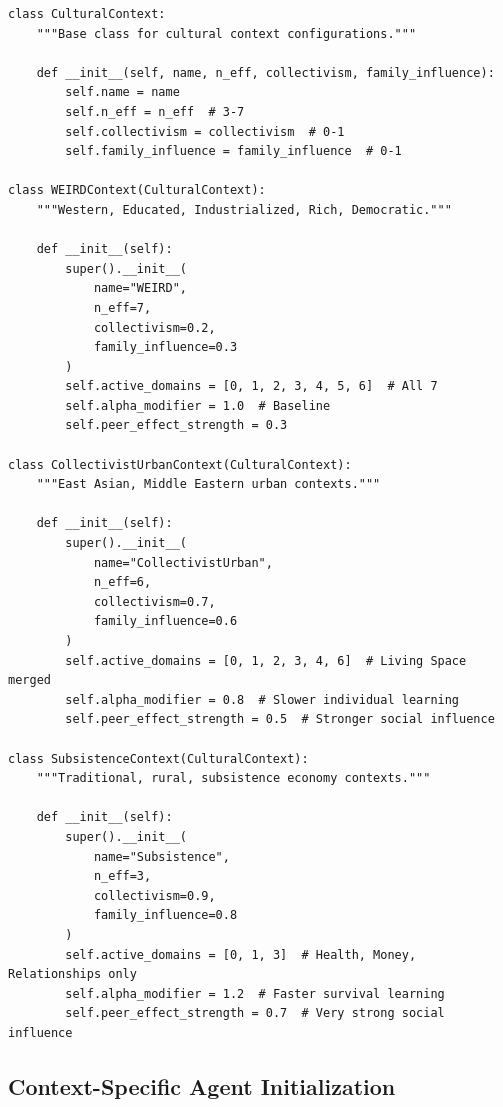 \begin{verbatim}
class CulturalContext:
    """Base class for cultural context configurations."""

    def __init__(self, name, n_eff, collectivism, family_influence):
        self.name = name
        self.n_eff = n_eff  # 3-7
        self.collectivism = collectivism  # 0-1
        self.family_influence = family_influence  # 0-1

class WEIRDContext(CulturalContext):
    """Western, Educated, Industrialized, Rich, Democratic."""

    def __init__(self):
        super().__init__(
            name="WEIRD",
            n_eff=7,
            collectivism=0.2,
            family_influence=0.3
        )
        self.active_domains = [0, 1, 2, 3, 4, 5, 6]  # All 7
        self.alpha_modifier = 1.0  # Baseline
        self.peer_effect_strength = 0.3

class CollectivistUrbanContext(CulturalContext):
    """East Asian, Middle Eastern urban contexts."""

    def __init__(self):
        super().__init__(
            name="CollectivistUrban",
            n_eff=6,
            collectivism=0.7,
            family_influence=0.6
        )
        self.active_domains = [0, 1, 2, 3, 4, 6]  # Living Space merged
        self.alpha_modifier = 0.8  # Slower individual learning
        self.peer_effect_strength = 0.5  # Stronger social influence

class SubsistenceContext(CulturalContext):
    """Traditional, rural, subsistence economy contexts."""

    def __init__(self):
        super().__init__(
            name="Subsistence",
            n_eff=3,
            collectivism=0.9,
            family_influence=0.8
        )
        self.active_domains = [0, 1, 3]  # Health, Money, Relationships only
        self.alpha_modifier = 1.2  # Faster survival learning
        self.peer_effect_strength = 0.7  # Very strong social influence
\end{verbatim}

\subsection{Context-Specific Agent Initialization}


